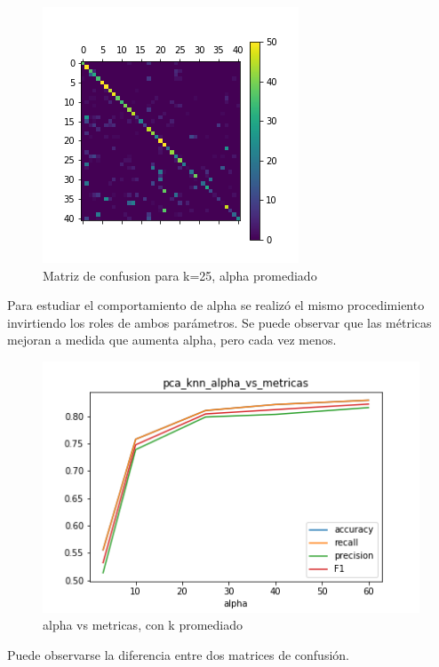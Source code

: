 \begin{figure}[H]
    \begin{center}
      \includegraphics[width=0.6\columnwidth]{imagenes/charuli-des/pca_knn_confusion_matrix_for_k_25.png}
      \caption{Matriz de confusion para k=25, alpha promediado}
    \end{center}
\end{figure}
 
 
Para estudiar el comportamiento de alpha se realizó el mismo procedimiento invirtiendo los roles de ambos parámetros. Se puede observar que las métricas mejoran a medida que aumenta alpha,  pero cada vez menos.
\begin{figure}[H]
    \begin{center}
      \includegraphics[width=0.6\columnwidth]{imagenes/charuli-des/pca_knn_alpha_vs_metricas.png}
      \caption{alpha vs metricas, con k promediado}
    \end{center}
\end{figure}
 
Puede observarse la diferencia entre dos matrices de confusión.
 

